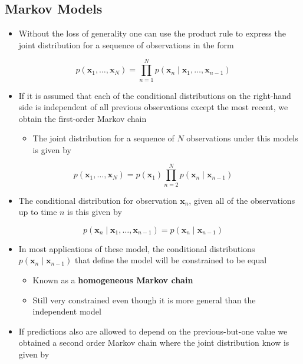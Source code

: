 \documentclass[11pt]{article}
\begin{document}
\subsection{Markov Models}
\label{sec:org11c61eb}
\begin{itemize}
\item Without the loss of generality one can use the product rule to express the joint distribution for a sequence of observations in the form
\end{itemize}
\begin{equation}
  p(\pmb x_1, \dots, \pmb x_N) = \prod_{n=1}^N p(\pmb x_n \mid \pmb x_1, \dots, \pmb x_{n-1})
\end{equation}
\begin{itemize}
\item If it is assumed that each of the conditional distributions on the right-hand side is independent of all previous observations except the most recent, we obtain the first-order Markov chain
\begin{itemize}
\item The joint distribution for a sequence of \(N\) observations under this models is given by
\end{itemize}
\end{itemize}
\begin{equation}
  p(\pmb x_1, \dots, \pmb x_N) = p(\pmb x_1) \prod_{n=2}^N p(\pmb x_n \mid \pmb x_{n-1})
\end{equation}
\begin{itemize}
\item The conditional distribution for observation \(\pmb x_n\), given all of the observations up to time \(n\) is this given by
\end{itemize}
\begin{equation}
	p(\pmb x_n \mid \pmb x_1, \dots, \pmb x_{n-1}) = p(\pmb x_n \mid \pmb x_{n-1})
\end{equation}
\begin{itemize}
\item In most applications of these model, the conditional distributions \(p(\pmb x_n \mid \pmb x_{n-1})\) that define the model will be constrained to be equal
\begin{itemize}
\item Known as a \textbf{homogeneous Markov chain}
\item Still very constrained even though it is more general than the independent model
\end{itemize}

\item If predictions also are allowed to depend on the previous-but-one value we obtained a second order Markov chain where the joint distribution know is given by
\end{itemize}
\end{document}
